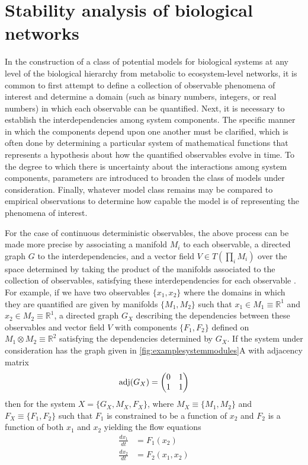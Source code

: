 \section{Stability analysis of biological networks}\label{sec:stabanalbn}
In the construction of a class of potential models for biological systems at any level of the biological hierarchy from metabolic to ecosystem-level networks, it is common to first attempt to define a collection of observable phenomena of interest and determine a domain (such as binary numbers, integers, or real numbers) in which each observable can be quantified. Next, it is necessary to establish the interdependencies among system components. The specific manner in which the components depend upon one another must be clarified, which is often done by determining a particular system of mathematical functions that represents a hypothesis about how the quantified observables evolve in time. To the degree to which there is uncertainty about the interactions among system components, parameters are introduced to broaden the class of models under consideration. Finally, whatever model class remains may be compared to empirical observations to determine how capable the model is of representing the phenomena of interest.

For the case of continuous deterministic observables, the above process can be made more precise by associating a manifold $M_i$ to each observable, a directed graph $G$ to the interdependencies, and a vector field $V \in T(\prod_i M_i)$ over the space determined by taking the product of the manifolds associated to the collection of observables, satisfying these interdependencies for each observable  \cite{Deville}. For example, if we have two observables $\{x_1,x_2\}$ where the domains in which they are quantified are given by manifolds $\{M_1,M_2\}$ such that $x_1 \in M_1 \equiv \mathbb{R}^1$ and $x_2 \in M_2 \equiv \mathbb{R}^1$, a directed graph $G_X$ describing the dependencies between these observables and vector field $V$ with components $\{F_1,F_2\}$ defined on $M_1 \otimes M_2 \equiv \mathbb{R}^2$ satisfying the dependencies determined by $G_X$. If the system under consideration has the graph given in \ref{fig:examplesystemmodules}A
% 
with adjacency matrix
$$
\mathrm{adj}(G_X) = \begin{pmatrix}
0 & 1 \\
1 & 1
\end{pmatrix}
$$
then for the system $X = \{G_X, M_X, F_X\}$, where $M_X \equiv \{M_1,M_2\}$ and $F_X \equiv \{F_1,F_2\}$ such that $F_1$ is constrained to be a function of $x_2$ and $F_2$ is a function of both $x_1$ and $x_2$ yielding the flow equations
\begin{align*}
\frac{dx_1}{dt} & = F_1(x_2)\\
\frac{dx_2}{dt} & = F_2(x_1,x_2)
\end{align*}

